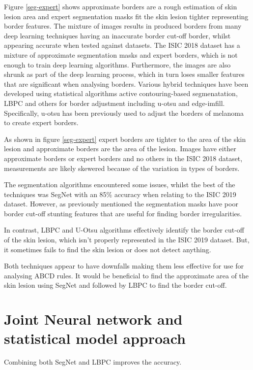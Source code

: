Figure \ref{seg-expert} shows approximate borders are a rough estimation of skin lesion area and expert segmentation masks fit the skin lesion tighter representing border features. The mixture of images results in produced borders from many deep learning techniques having an inaccurate border cut-off border, whilst appearing accurate when tested against datasets. The ISIC 2018 dataset has a mixture of approximate segmentation masks and expert borders, which is not enough to train deep learning algorithms. Furthermore, the images are also shrunk as part of the deep learning process, which in turn loses smaller features that are significant when analysing borders. Various hybrid techniques have been developed using statistical algorithms active contouring-based segmenatation\cite{Riaz2019}, LBPC and others for border adjustment including u-otsu and edge-imfill. Specifically, u-otsu has been previously used to adjust the borders of melanoma to create expert borders\cite{}.

As shown in figure \ref{seg-expert} expert borders are tighter to the area of the skin lesion and approximate borders are the area of the lesion. Images have either approximate borders or expert borders and no others in the ISIC 2018 dataset, measurements are likely skewered because of the variation in types of borders.

The segmentation algorithms encountered some issues, whilst the best of the techniques was SegNet with an 85\% accuracy when relating to the ISIC 2019 dataset. However, as previously mentioned the segmentation masks have poor border cut-off stunting features that are useful for finding border irregularities. 

In contrast, LBPC and U-Otsu algorithms effectively identify the border cut-off of the skin lesion, which isn't properly represented in the ISIC 2019 dataset. But, it sometimes fails to find the skin lesion or does not detect anything. 

Both techniques appear to have downfalls making them less effective for use for analysing ABCD rules. It would be beneficial to find the approximate area of the skin lesion using SegNet and followed by LBPC to find the border cut-off.

\section{Joint Neural network and statistical model approach}

Combining both SegNet and LBPC improves the accuracy.
